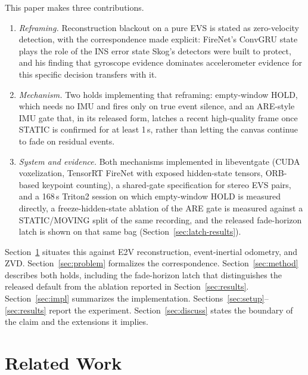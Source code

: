 \documentclass[journal]{IEEEtran}
\begin{document}
This paper makes three contributions.
\begin{enumerate}
\item \textit{Reframing.} Reconstruction blackout on a pure EVS is stated as
zero-velocity detection, with the correspondence made explicit: FireNet's
ConvGRU state plays the role of the INS error state Skog's detectors were built
to protect, and his finding that gyroscope evidence dominates accelerometer
evidence for this specific decision transfers with it.
\item \textit{Mechanism.} Two holds implementing that reframing: empty-window
HOLD, which needs no IMU and fires only on true event silence, and an ARE-style
IMU gate that, in its released form, latches a recent high-quality frame once
STATIC is confirmed for at least 1\,s, rather than letting the canvas continue
to fade on residual events.
\item \textit{System and evidence.} Both mechanisms implemented in libeventgate
\cite{libeventgate} (CUDA voxelization, TensorRT FireNet with exposed
hidden-state tensors, ORB-based keypoint counting), a shared-gate specification
for stereo EVS pairs, and a 168\,s Triton2 session on which empty-window HOLD is
measured directly, a freeze-hidden-state ablation of the ARE gate is measured
against a STATIC/MOVING split of the same recording, and the released
fade-horizon latch is shown on that same bag (Section~\ref{sec:latch-results}).
\end{enumerate}

Section~\ref{sec:related} situates this against E2V reconstruction,
event-inertial odometry, and ZVD. Section~\ref{sec:problem} formalizes the
correspondence. Section~\ref{sec:method} describes both holds, including the
fade-horizon latch that distinguishes the released default from the ablation
reported in Section~\ref{sec:results}. Section~\ref{sec:impl} summarizes the
implementation. Sections~\ref{sec:setup}--\ref{sec:results} report the
experiment. Section~\ref{sec:discuss} states the boundary of the claim and the
extensions it implies.

\section{Related Work}
\label{sec:related}
\end{document}
